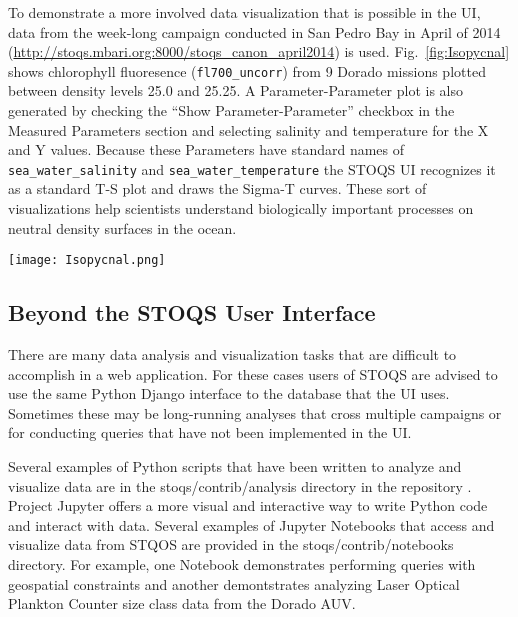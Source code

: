 \documentclass[conference]{IEEEtran}
\begin{document}
To demonstrate a more involved data visualization that is possible in the UI, data from the week-long
campaign conducted in San Pedro Bay in April of 2014 
(\url{http://stoqs.mbari.org:8000/stoqs_canon_april2014}) is used.
Fig.~\ref{fig:Isopycnal} shows chlorophyll fluoresence (\texttt{fl700\_uncorr}) from 9 Dorado missions 
plotted between density levels 25.0 and 25.25. A Parameter-Parameter plot is also generated
by checking the ``Show Parameter-Parameter'' checkbox in the Measured Parameters section
and selecting salinity and temperature for the X and Y values. Because these Parameters
have standard names of \texttt{sea\_water\_salinity} and \texttt{sea\_water\_temperature} the STOQS
UI recognizes it as a standard T-S plot and draws the Sigma-T curves.
These sort of visualizations help scientists understand biologically important processes
on neutral density surfaces in the ocean.

\begin{figure*}[htbp]
\centering
\texttt{[image: Isopycnal.png]}
\caption{Chlorophyll fluoresence measurement from a week-long set of missions by AUV Dorado 
selected for plotting between isopycnal values of 25.0 and 25.25. Higher values are seen
on the shelf supporting the hypothesis that the shallower water acts as an incubator for
phytoplankton.}
\label{fig:Isopycnal}
\end{figure*}




\subsection{Beyond the STOQS User Interface}

There are many data analysis and visualization tasks that are difficult to
accomplish in a web application. For these cases users of STOQS are advised to 
use the same Python Django interface to the database that the UI
uses. Sometimes these may be long-running analyses that cross
multiple campaigns or for conducting queries that have not been implemented
in the UI.

Several examples of Python scripts that have been written to analyze and
visualize data are in the stoqs/contrib/analysis directory 
in the repository \cite{stoqs_github}. Project Jupyter 
offers a more visual and interactive way to write Python code and interact
with data. Several examples of Jupyter Notebooks that access and visualize
data from STQOS are provided in the stoqs/contrib/notebooks directory.
For example, one Notebook demonstrates performing queries with geospatial
constraints and another demontstrates analyzing Laser Optical
Plankton Counter size class data from the Dorado AUV.
\end{document}
